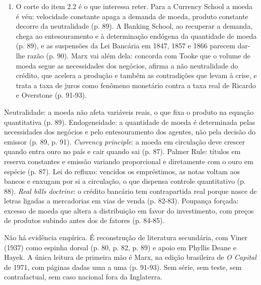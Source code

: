 \begin{enumerate}[leftmargin=*,nosep]
\item O corte do item 2.2 é o que interessa reter. Para a Currency School a
moeda é véu: velocidade constante apaga a demanda de moeda, produto constante
decorre da neutralidade (p. 89). A Banking School, ao recuperar a demanda, chega
ao entesouramento e à determinação endógena da quantidade de moeda (p. 89), e as
suspensões da Lei Bancária em 1847, 1857 e 1866 parecem dar-lhe razão (p. 90).
Marx vai além dela: concorda com Tooke que o volume de moeda segue as
necessidades dos negócios, afirma a não neutralidade do crédito, que acelera a
produção e também as contradições que levam à crise, e trata a taxa de juros
como fenômeno monetário contra a taxa real de Ricardo e Overstone (p. 91-93).
\end{enumerate}


Neutralidade: a moeda não afeta variáveis reais, o que fixa o produto na equação
quantitativa (p. 89). Endogeneidade: a quantidade de moeda é determinada pelas
necessidades dos negócios e pelo entesouramento dos agentes, não pela decisão do
emissor (p. 89, p. 91). \emph{Currency principle}: a moeda em circulação deve
crescer quando entra ouro no país e cair quando sai (p. 87). Palmer Rule:
títulos em reserva constantes e emissão variando proporcional e diretamente com
o ouro em espécie (p. 87). Lei do refluxo: vencidos os empréstimos, as notas
voltam aos bancos e enxugam por si a circulação, o que dispensa controle
quantitativo (p. 88). \emph{Real bills doctrine}: o crédito bancário tem
contrapartida real porque nasce de letras ligadas a mercadorias em vias de venda
(p. 82-83). Poupança forçada: excesso de moeda que altera a distribuição em
favor do investimento, com preços de produtos subindo antes dos de fatores
(p. 84-85).

Não há evidência empírica. É reconstrução de literatura secundária, com Viner
(1937) como espinha dorsal (p. 80, p. 82, p. 89) e apoio em Phyllis Deane e
Hayek. A única leitura de primeira mão é Marx, na edição brasileira de \emph{O
Capital} de 1971, com páginas dadas uma a uma (p. 91-93). Sem série, sem teste,
sem contrafactual, sem caso nacional fora da Inglaterra.


